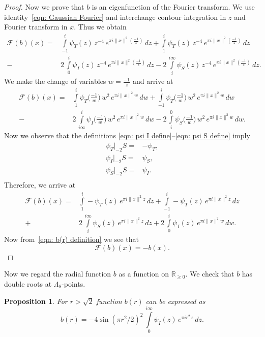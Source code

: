 \documentclass{scrartcl}
\newcommand{\R}{\mathbb{R}}
\newtheorem{proposition}{Proposition}
\begin{document}
\begin{proof}
Now we prove that $b$ is an eigenfunction of the Fourier transform. We use identity~\eqref{eqn: Gaussian Fourier} and interchange contour integration in $z$ and Fourier transform in $x$. Thus we obtain
\begin{align*}
  \mathcal{F}(b)(x)= & \int\limits_{-1}^{i}\psi_T(z)\,z^{-4}\,e^{\pi i \|x\|^2 (\frac{-1}{z})}\,dz
    + \int\limits_{1}^{i}\psi_T(z)\,z^{-4}\,e^{\pi i \|x\|^2 (\frac{-1}{z})}\,dz \\
  -& 2\,\int\limits_{0}^{i}\psi_I(z)\,z^{-4}\,e^{\pi i \|x\|^2 (\frac{-1}{z})}\,dz
  - 2\,\int\limits_{i}^{i\infty}\psi_S(z)\,z^{-4}\,e^{\pi i \|x\|^2 (\frac{-1}{z})}\,dz.
\end{align*}
We make the change of variables $w=\frac{-1}{z}$ and arrive at
\begin{align*}
  \mathcal{F}(b)(x)= & \int\limits_{1}^{i}\psi_T\Big(\frac{-1}{w}\Big)\,w^{2}\,e^{\pi i \|x\|^2 w}\,dw
    + \int\limits_{-1}^{i}\psi_T\Big(\frac{-1}{w}\Big)\,w^{2}\,e^{\pi i \|x\|^2 w}\,dw \\
  -& 2\,\int\limits_{i\infty}^{i}\psi_I\Big(\frac{-1}{w}\Big)\,w^{2}\,e^{\pi i \|x\|^2 w}\,dw
  - 2\,\int\limits_{i}^{0}\psi_S\Big(\frac{-1}{w}\Big)\,w^{2}\,e^{\pi i \|x\|^2 w}\,dw.
\end{align*}
Now we observe that the definitions \eqref{eqn: psi I define}--\eqref{eqn: psi S define}   imply
\begin{align*}\psi_T|_{-2}S=&-\psi_T ,\\
\psi_I|_{-2}S=&\psi_S ,\\
\psi_S|_{-2}S=&\psi_I. \\
\end{align*}
Therefore, we arrive at
\begin{align*}
  \mathcal{F}(b)(x)= & \int\limits_{1}^{i}-\psi_T(z)\,e^{\pi i \|x\|^2 z}\,dz
    + \int\limits_{-1}^{i}-\psi_T(z)\,e^{\pi i \|x\|^2 z}\,dz \\
  +& 2\,\int\limits_{i}^{i\infty}\psi_S(z)\,e^{\pi i \|x\|^2 z}\,dz
  + 2\,\int\limits_{0}^{i}\psi_I(z)\,e^{\pi i \|x\|^2 w}\,dw.
\end{align*}
Now from~\eqref{eqn: b(r) definition} we see that
$$ \mathcal{F}(b)(x)=-b(x). $$
\end{proof}
Now we regard the radial function  $b$ as a function on $\R_{\geq0}$. We check that $b$ has double roots at $\Lambda_8$-points.
\begin{proposition}\label{prop: b(r) double zeroes} For $r>\sqrt{2}$ function $b(r)$ can be expressed as
\begin{equation}\label{eqn: b double zeroes}
  b(r)=-4\sin(\pi r^2/2)^2\,\int\limits_{0}^{i\infty}\psi_I(z)\,e^{\pi i r^2 \,z}\,dz.
\end{equation}
\end{proposition}
\end{document}
